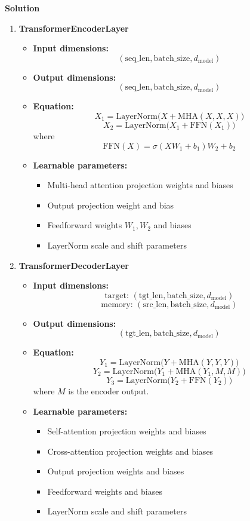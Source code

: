 \documentclass[10pt]{article}
\begin{document}
\textbf{Solution}

\begin{enumerate}[label=\roman*.]

\item \textbf{TransformerEncoderLayer}

\begin{itemize}
    \item \textbf{Input dimensions:}
    \[
    (\text{seq\_len}, \text{batch\_size}, d_{\text{model}})
    \]
    \item \textbf{Output dimensions:}
    \[
    (\text{seq\_len}, \text{batch\_size}, d_{\text{model}})
    \]
    \item \textbf{Equation:}
    \[
    X_1 = \mathrm{LayerNorm}\bigl(X + \mathrm{MHA}(X,X,X)\bigr)
    \]
    \[
    X_2 = \mathrm{LayerNorm}\bigl(X_1 + \mathrm{FFN}(X_1)\bigr)
    \]
    where
    \[
    \mathrm{FFN}(X)=\sigma(XW_1+b_1)W_2+b_2
    \]
    \item \textbf{Learnable parameters:}
    \begin{itemize}
        \item Multi-head attention projection weights and biases
        \item Output projection weight and bias
        \item Feedforward weights $W_1,W_2$ and biases
        \item LayerNorm scale and shift parameters
    \end{itemize}
\end{itemize}

\item \textbf{TransformerDecoderLayer}

\begin{itemize}
    \item \textbf{Input dimensions:}
    \[
    \text{target: } (\text{tgt\_len}, \text{batch\_size}, d_{\text{model}})
    \]
    \[
    \text{memory: } (\text{src\_len}, \text{batch\_size}, d_{\text{model}})
    \]
    \item \textbf{Output dimensions:}
    \[
    (\text{tgt\_len}, \text{batch\_size}, d_{\text{model}})
    \]
    \item \textbf{Equation:}
    \[
    Y_1 = \mathrm{LayerNorm}\bigl(Y + \mathrm{MHA}(Y,Y,Y)\bigr)
    \]
    \[
    Y_2 = \mathrm{LayerNorm}\bigl(Y_1 + \mathrm{MHA}(Y_1,M,M)\bigr)
    \]
    \[
    Y_3 = \mathrm{LayerNorm}\bigl(Y_2 + \mathrm{FFN}(Y_2)\bigr)
    \]
    where $M$ is the encoder output.
    \item \textbf{Learnable parameters:}
    \begin{itemize}
        \item Self-attention projection weights and biases
        \item Cross-attention projection weights and biases
        \item Output projection weights and biases
        \item Feedforward weights and biases
        \item LayerNorm scale and shift parameters
    \end{itemize}
\end{itemize}


\end{enumerate}
\end{document}
